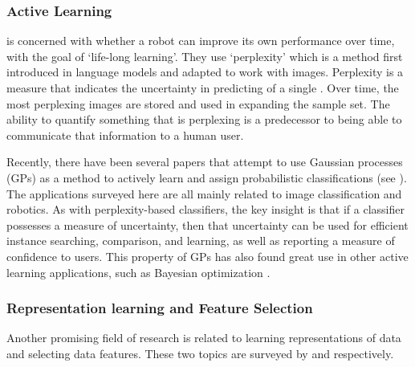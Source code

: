 \subsubsection{Active Learning}
    \citet{Paul2011-vr} is concerned with whether a robot can improve its own performance over time, with the goal of `life-long learning'. They use `perplexity' which is a method first introduced in language models and adapted to work with images. Perplexity is a measure that indicates the uncertainty in predicting  of a single . Over time, the most perplexing images are stored and used in expanding the sample set. The ability to quantify something that is perplexing is a predecessor to being able to communicate that information to a human user. 

    Recently, there have been several papers that attempt to use Gaussian processes (GPs) as a method to actively learn and assign probabilistic classifications (see \citet{MacKay1992-sp,Triebel2016-kj,Triebel2013-ow,Triebel2013-ku,Grimmett2013-gj,Grimmett2016-yc,Berczi2015-rd,Dequaire2016-kh}). The applications surveyed here are all mainly related to image classification and robotics. As with perplexity-based classifiers, the key insight is that if a classifier possesses a measure of uncertainty, then that uncertainty can be used for efficient instance searching, comparison, and learning, as well as reporting a measure of confidence to users. 
This property of GPs has also found great use in other active learning applications, such as  Bayesian optimization . 

\subsubsection{Representation learning and Feature Selection}
    Another promising field of research is related to learning representations of data and selecting data features. These two topics are surveyed by \citet{Bengio2013-uv} and \citet{Guyon2003-fj} respectively.  

